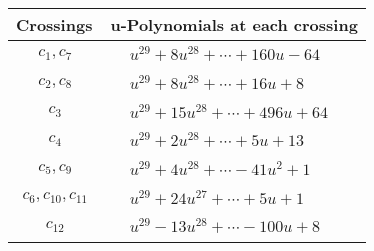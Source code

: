 \documentclass[1p]{elsarticle_modified}
\theoremstyle{definition}
\begin{document}
\begin{tabular}{m{50pt}|m{274pt}}
Crossings & \hspace{64pt}u-Polynomials at each crossing \\
\hline $$\begin{aligned}c_{1},c_{7}\end{aligned}$$&$\begin{aligned}
&u^{29}+8 u^{28}+\cdots+160 u-64
\end{aligned}$\\
\hline $$\begin{aligned}c_{2},c_{8}\end{aligned}$$&$\begin{aligned}
&u^{29}+8 u^{28}+\cdots+16 u+8
\end{aligned}$\\
\hline $$\begin{aligned}c_{3}\end{aligned}$$&$\begin{aligned}
&u^{29}+15 u^{28}+\cdots+496 u+64
\end{aligned}$\\
\hline $$\begin{aligned}c_{4}\end{aligned}$$&$\begin{aligned}
&u^{29}+2 u^{28}+\cdots+5 u+13
\end{aligned}$\\
\hline $$\begin{aligned}c_{5},c_{9}\end{aligned}$$&$\begin{aligned}
&u^{29}+4 u^{28}+\cdots-41 u^2+1
\end{aligned}$\\
\hline $$\begin{aligned}c_{6},c_{10},c_{11}\end{aligned}$$&$\begin{aligned}
&u^{29}+24 u^{27}+\cdots+5 u+1
\end{aligned}$\\
\hline $$\begin{aligned}c_{12}\end{aligned}$$&$\begin{aligned}
&u^{29}-13 u^{28}+\cdots-100 u+8
\end{aligned}$\\
\hline
\end{tabular}\\~\\
\newpage\renewcommand{\arraystretch}{1}
\end{document}
